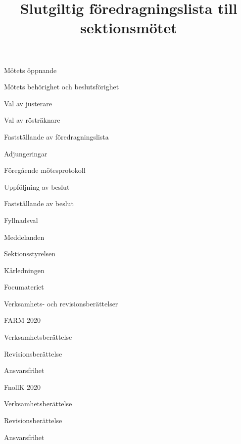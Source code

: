 \documentclass{sektionsmote}
\title{Slutgiltig föredragningslista till sektionsmötet}
\begin{document}
\maketitle

\begin{ootd}

\item{Mötets öppnande}

\item{Mötets behörighet och beslutsförighet}

\item{Val av justerare}

\item{Val av rösträknare}

\item{Fastställande av föredragningslista}

\item{Adjungeringar}

\item{Föregående mötesprotokoll}

\item{Uppföljning av beslut}

\item{Fastställande av beslut}
\begin{ootd}
    \item Fyllnadsval
\end{ootd}

\item{Meddelanden}
\begin{ootd}
    \item Sektionsstyrelsen
    \item Kårledningen
    \item Focumateriet
\end{ootd}

\item{Verksamhets- och revisionsberättelser}
\begin{ootd}
    \item FARM 2020
    \begin{ootd}
        \item Verksamhetsberättelse
        \item Revisionsberättelse
        \item Ansvarsfrihet
    \end{ootd}
    \item FnollK 2020
    \begin{ootd}
        \item Verksamhetsberättelse
        \item Revisionsberättelse
        \item Ansvarsfrihet
    \end{ootd}
\end{ootd}


\end{ootd}
\end{document}
